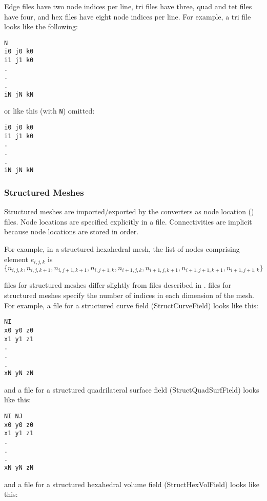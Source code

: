 Edge files have two node indices per line, tri files have three, quad
and tet files have four, and hex files have eight node indices per
line.  For example, a tri file looks like the following:

\begin{verbatim}
N
i0 j0 k0
i1 j1 k0
.
.
.
iN jN kN
\end{verbatim}

or like this (with \verb|N|) omitted:

\begin{verbatim}
i0 j0 k0
i1 j1 k0
.
.
.
iN jN kN
\end{verbatim}

\subsubsection{Structured Meshes}

Structured meshes are imported/exported by the converters as node
location () files.  Node locations are specified explicitly in a
 file. Connectivities are implicit because node locations are
stored in  order.

For example, in a structured hexahedral mesh, the list of nodes comprising
element \(e_{i,j,k}\) is \(\{n_{i,j,k}, n_{i,j,k+1}, n_{i,j+1,k+1}, n_{i,j+1,k}, n_{i+1,j,k}, n_{i+1,j,k+1}, n_{i+1,j+1,k+1}, n_{i+1,j+1,k}\}\)

 files for structured meshes differ slightly
from  files described in .   files for
structured meshes specify the number of indices in each dimension of the
mesh.  For example, a  file for a structured curve field
(StructCurveField) looks like this:

\begin{verbatim}
NI
x0 y0 z0
x1 y1 z1
.
.
.
xN yN zN
\end{verbatim}

and a  file for a structured quadrilateral surface field
(StructQuadSurfField) looks like this:

\begin{verbatim}
NI NJ
x0 y0 z0
x1 y1 z1
.
.
.
xN yN zN
\end{verbatim}

and a  file for a structured hexahedral volume field
(StructHexVolField) looks like this:

